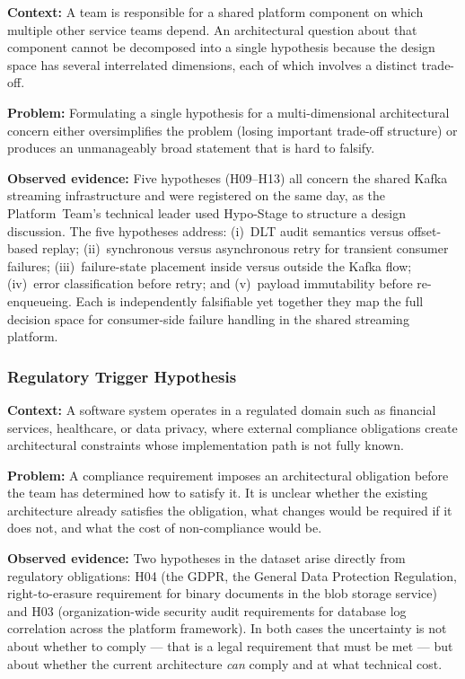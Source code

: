 \textbf{Context:} A team is responsible for a shared platform component on which
multiple other service teams depend. An architectural question about that
component cannot be decomposed into a single hypothesis because the design space
has several interrelated dimensions, each of which involves a distinct trade-off.

\textbf{Problem:} Formulating a single hypothesis for a multi-dimensional
architectural concern either oversimplifies the problem (losing important
trade-off structure) or produces an unmanageably broad statement that is hard
to falsify.

\textbf{Observed evidence:} Five hypotheses (H09–H13) all concern the shared
Kafka streaming infrastructure and were registered on the same day, as the
Platform~Team's technical leader used Hypo-Stage to structure a design discussion.
The five hypotheses address: (i)~DLT audit semantics versus offset-based replay;
(ii)~synchronous versus asynchronous retry for transient consumer failures;
(iii)~failure-state placement inside versus outside the Kafka flow;
(iv)~error classification before retry; and (v)~payload immutability before
re-enqueueing. Each is independently falsifiable yet together they map the full
decision space for consumer-side failure handling in the shared streaming
platform.

\subsubsection{Regulatory Trigger Hypothesis}
\label{subsubsec:pattern-b2}
\textbf{Context:} A software system operates in a regulated domain such as financial
services, healthcare, or data privacy, where external compliance obligations
create architectural constraints whose implementation path is not fully known.

\textbf{Problem:} A compliance requirement imposes an architectural obligation
before the team has determined how to satisfy it. It is unclear whether the
existing architecture already satisfies the obligation, what changes would be
required if it does not, and what the cost of non-compliance would be.

\textbf{Observed evidence:} Two hypotheses in the dataset arise directly from
regulatory obligations: H04 (the GDPR, the General Data Protection Regulation, right-to-erasure requirement for binary
documents in the blob storage service) and H03 (organization-wide security
audit requirements for database log correlation across the platform framework).
In both cases the uncertainty is not about whether to comply — that is a legal
requirement that must be met — but about whether the current architecture \textit{can} comply and at
what technical cost.

